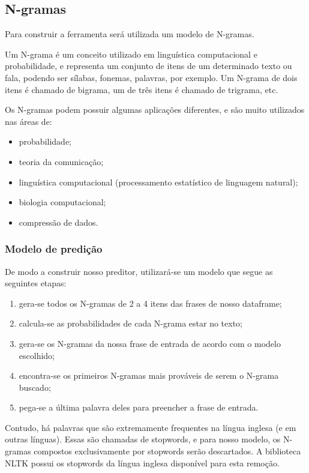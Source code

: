 \documentclass[a4paper,11pt,final]{article}
\begin{document}
\subsection{N-gramas}

Para construir a ferramenta será utilizada um modelo de N-gramas.

Um N-grama é um conceito utilizado em linguística computacional e probabilidade, e representa um conjunto de itens de um determinado texto ou fala, podendo ser sílabas, fonemas, palavras, por exemplo. 
Um N-grama de dois itens é chamado de bigrama, um de três itens é chamado de trigrama, etc.
	
Os N-gramas podem possuir algumas aplicações diferentes, e são muito utilizados nas áreas de:

\begin{itemize}
    \item probabilidade;
    \item teoria da comunicação;
    \item linguística computacional (processamento estatístico de linguagem natural);
    \item biologia computacional;
    \item compressão de dados.
\end{itemize}

\subsubsection{Modelo de predição}

De modo a construir nosso preditor, utilizará-se um modelo que segue as seguintes etapas:

\begin{enumerate}
    \item gera-se todos os N-gramas de 2 a 4 itens das frases de nosso dataframe;
    \item calcula-se as probabilidades de cada N-grama estar no texto;
    \item gera-se os N-gramas da nossa frase de entrada de acordo com o modelo escolhido;
    \item encontra-se os primeiros N-gramas mais prováveis de serem o N-grama buscado;
    \item pega-se a última palavra deles para preencher a frase de entrada.
\end{enumerate}

Contudo, há palavras que são extremamente frequentes na língua inglesa (e em outras línguas).
Essas são chamadas de stopwords, e para nosso modelo, os N-gramas compostos exclusivamente por stopwords serão descartados.
A biblioteca NLTK possui os stopwords da língua inglesa disponível para esta remoção.
\end{document}
